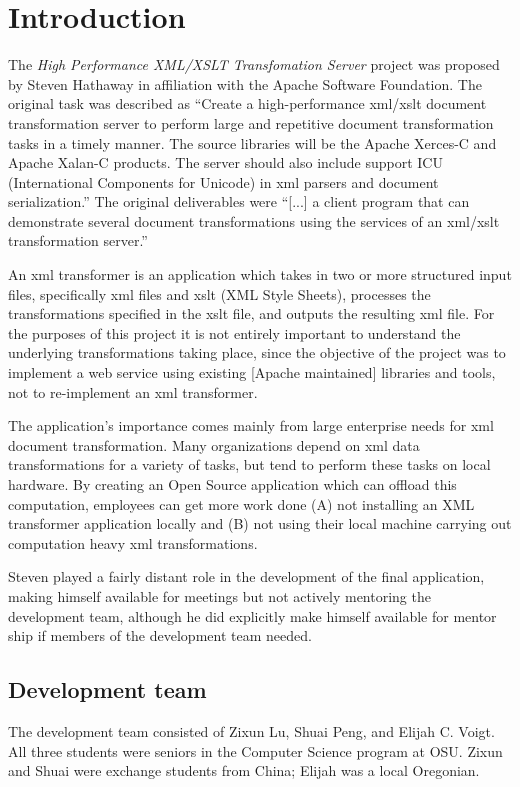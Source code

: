 \section{Introduction}



The \textit{High Performance XML/XSLT Transfomation Server} project was proposed by Steven Hathaway in affiliation with the Apache Software Foundation.
The original task was described as ``Create a high-performance \gls{xml}/\gls{xslt} document transformation server to perform large and repetitive document transformation tasks in a timely manner.
The source libraries will be the Apache Xerces-C and Apache Xalan-C products.
The server should also include support ICU (International Components for Unicode) in \gls{xml} parsers and document serialization.''
The original deliverables were ``[...] a client program that can demonstrate several document transformations using the services of an \gls{xml}/\gls{xslt} transformation server.'' 

An \gls{xml} transformer is an application which takes in two or more structured input files, specifically \gls{xml} files and \gls{xslt} (XML Style Sheets), processes the transformations specified in the \gls{xslt} file, and outputs the resulting \gls{xml} file.
For the purposes of this project it is not entirely important to understand the underlying transformations taking place, since the objective of the project was to implement a web service using existing [Apache maintained] libraries and tools, not to re-implement an \gls{xml} transformer.

The application's importance comes mainly from large enterprise needs for \gls{xml} document transformation.
Many organizations depend on \gls{xml} data transformations for a variety of tasks, but tend to perform these tasks on local hardware.
By creating an Open Source application which can offload this computation, employees can get more work done (A) not installing an XML transformer application locally and (B) not using their local machine carrying out computation heavy \gls{xml} transformations.

Steven played a fairly distant role in the development of the final application, making himself available for meetings but not actively mentoring the development team, although he did explicitly make himself available for mentor ship if members of the development team needed.

\subsection{Development team}

The development team consisted of Zixun Lu, Shuai Peng, and Elijah C. Voigt.
All three students were seniors in the Computer Science program at OSU.
Zixun and Shuai were exchange students from China; Elijah was a local Oregonian.
